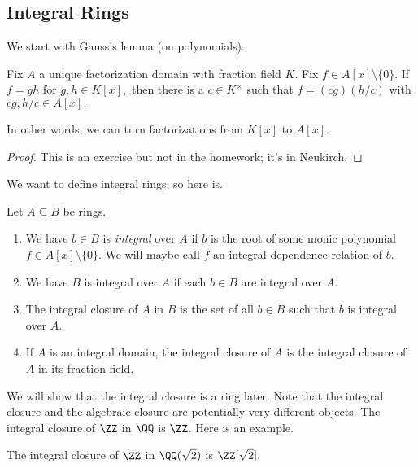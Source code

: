 \documentclass[../notes.tex]{subfiles}
\begin{document}
\subsection{Integral Rings}
We start with Gauss's lemma (on polynomials).
\begin{lem}[Gauss] \label{lem:gauss}
    Fix $A$ a unique factorization domain with fraction field $K.$ Fix $f\in A[x]\setminus\{0\}.$ If $f=gh$ for $g,h\in K[x],$ then there is a $c\in K^\times$ such that $f=(cg)(h/c)$ with $cg,h/c\in A[x].$
\end{lem}
In other words, we can turn factorizations from $K[x]$ to $A[x].$
\begin{proof}
    This is an exercise but not in the homework; it's in Neukirch.
\end{proof}
We want to define integral rings, so here is.
\begin{defi}[Integral]
    Let $A\subseteq B$ be rings.
    \begin{enumerate}[label=(\alph*)]
        \item We have $b\in B$ is \textit{integral} over $A$ if $b$ is the root of some monic polynomial $f\in A[x]\setminus\{0\}.$ We will maybe call $f$ an integral dependence relation of $b.$
        \item We have $B$ is integral over $A$ if each $b\in B$ are integral over $A.$
        \item The integral closure of $A$ in $B$ is the set of all $b\in B$ such that $b$ is integral over $A.$
        \item If $A$ is an integral domain, the integral closure of $A$ is the integral closure of $A$ in its fraction field.
    \end{enumerate}
\end{defi}
We will show that the integral closure is a ring later. Note that the integral closure and the algebraic closure are potentially very different objects. The integral closure of $\ZZ$ in $\QQ$ is $\ZZ.$ Here is an example.
\begin{prop}
    The integral closure of $\ZZ$ in $\QQ(\sqrt2)$ is $\ZZ[\sqrt2].$
\end{prop}
\end{document}
